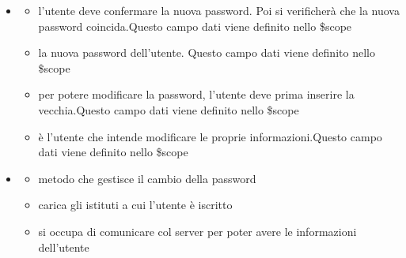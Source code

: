 \begin{itemize}
\item {}
\begin{itemize}
\item {}
\newline
l'utente deve confermare la nuova password. Poi si verificherà che la nuova password coincida.Questo campo dati viene definito nello \$scope
\item {}
\newline
la nuova password dell'utente. Questo campo dati viene definito nello \$scope
\item {}
\newline
per potere modificare la password, l'utente deve prima inserire la vecchia.Questo campo dati viene definito nello \$scope
\item {}
\newline
è l'utente che intende modificare le proprie informazioni.Questo campo dati viene definito nello \$scope
\end{itemize}
\item {}
\begin{itemize}
\item {}
\newline
metodo che gestisce il cambio della password
\newline
\item {}
\newline
carica gli istituti a cui l'utente è iscritto
\newline
\item {}
\newline
si occupa di comunicare col server per poter avere le informazioni dell'utente
\newline
\end{itemize}
\end{itemize}
